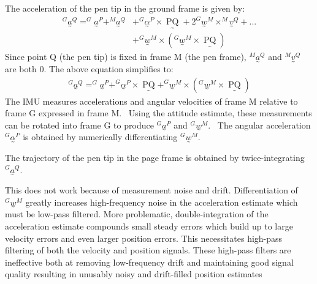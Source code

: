 \documentclass{article}
\newcommand{\nosymbol}{}
\newcommand{\tmop}[1]{\ensuremath{\operatorname{#1}}}
\begin{document}
The acceleration of the pen tip in the ground frame is given by:
\begin{align*}
  ^G \underset{\mbox{\textasciitilde}}{a}^Q =^G
  \underset{\mbox{\textasciitilde}}{a}^P +^M
  \underset{\mbox{\textasciitilde}}{a}^Q &+^G
  \underset{\mbox{\textasciitilde}}{\alpha}^P \times
  \underset{\mbox{\textasciitilde}}{\tmop{PQ}} + 2^G
  \underset{\mbox{\textasciitilde}}{w}^M \times^M
  \underset{\mbox{\textasciitilde}}{v}^Q + ... \\ &+ ^G 
  \underset{\mbox{\textasciitilde}}{w}^M \times \left(^G
  \underset{\mbox{\textasciitilde}}{w}^M \times
  \underset{\mbox{\textasciitilde}}{\tmop{PQ}} \right)
\end{align*}
Since point Q (the pen tip) is fixed in frame M (the pen frame), $^M
\underset{\mbox{\textasciitilde}}{a}^Q$ and $^M
\underset{\mbox{\textasciitilde}}{v}^Q$ are both 0. The above equation
simplifies to:
\begin{eqnarray*}
  & ^G \underset{\mbox{\textasciitilde}}{a}^Q =^G
  \underset{\mbox{\textasciitilde}}{a}^P +^G
  \underset{\mbox{\textasciitilde}}{\alpha}^P \times
  \underset{\mbox{\textasciitilde}}{\tmop{PQ}} +^G
  \underset{\mbox{\textasciitilde}}{w}^M \times \left(^G
  \underset{\mbox{\textasciitilde}}{w}^M \times
  \underset{\mbox{\textasciitilde}}{\tmop{PQ}} \right) & 
\end{eqnarray*}
The IMU measures accelerations and angular velocities of frame M relative to
frame G expressed in frame M. \ Using the attitude estimate, these
measurements can be rotated into frame G to produce $^G
\underset{\mbox{\textasciitilde}}{a}^P$ and $^G
\underset{\mbox{\textasciitilde}}{w}^M \nosymbol$. \ The angular acceleration
$^G \underset{\mbox{\textasciitilde}}{\alpha}^P$ is obtained by numerically
differentiating $^G \underset{\mbox{\textasciitilde}}{w}^M$.

The trajectory of the pen tip in the page frame is obtained by
twice-integrating $^G \underset{\mbox{\textasciitilde}}{a}^Q$.

This does not work because of measurement noise and drift. Differentiation
of $^G \underset{\mbox{\textasciitilde}}{w}^M$ greatly increases
high-frequency noise in the acceleration estimate which must be low-pass
filtered. More problematic, double-integration of the acceleration estimate
compounds small steady errors which build up to large velocity errors and even
larger position errors. This necessitates high-pass filtering of both the
velocity and position signals. These high-pass filters are ineffective both
at removing low-frequency drift and maintaining good signal quality resulting
in unusably noisy and drift-filled position estimates
\end{document}
